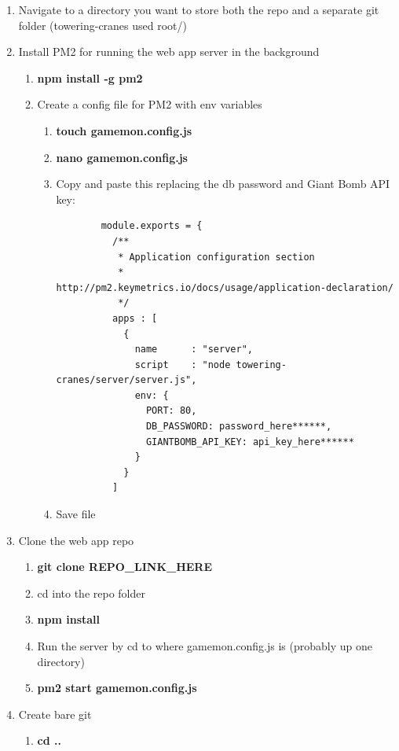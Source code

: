 \documentclass{article}
\begin{document}
\begin{enumerate}
  \begin{enumerate}
    \item Navigate to a directory you want to store both the repo and a separate git folder (towering-cranes used root/)
    \item Install PM2 for running the web app server in the background
    \begin{enumerate}
      \item \textbf{npm install -g pm2}
      \item Create a config file for PM2 with env variables
      \begin{enumerate}
        \item \textbf{touch gamemon.config.js}
        \item \textbf{nano gamemon.config.js}
        \item Copy and paste this replacing the db password and Giant Bomb API key:
        \begin{lstlisting}
        module.exports = {
          /**
           * Application configuration section
           * http://pm2.keymetrics.io/docs/usage/application-declaration/
           */
          apps : [
            {
              name      : "server",
              script    : "node towering-cranes/server/server.js",
              env: {
                PORT: 80,
                DB_PASSWORD: password_here******,
                GIANTBOMB_API_KEY: api_key_here******
              }
            }
          ]
        \end{lstlisting}
        \item Save file
      \end{enumerate}
    \end{enumerate}
    \item Clone the web app repo
    \begin{enumerate}
      \item \textbf{git clone REPO\_LINK\_HERE}
      \item cd into the repo folder
      \item \textbf{npm install}
      \item Run the server by cd to where gamemon.config.js is (probably up one directory)
      \item \textbf{pm2 start gamemon.config.js}
    \end{enumerate}
    \item Create bare git
    \begin{enumerate}
      \item \textbf{cd ..}

\end{enumerate}
\end{enumerate}
\end{enumerate}
\end{document}
